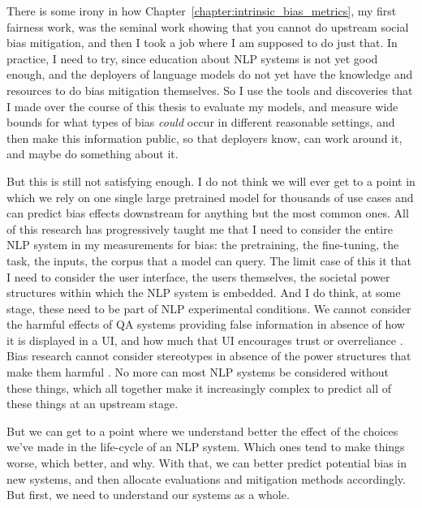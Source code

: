 There is some irony in how Chapter~\ref{chapter:intrinsic_bias_metrics}, my first fairness work, was the seminal work showing that you cannot do upstream social bias mitigation, and then I took a job where I am supposed to do just that. In practice, I need to try, since education about NLP systems is not yet good enough, and the deployers of language models do not yet have the knowledge and resources to do bias mitigation themselves. So I use the tools and discoveries that I made over the course of this thesis to evaluate my models, and measure wide bounds for what types of bias \textit{could} occur in different reasonable settings, and then make this information public, so that deployers know, can work around it, and maybe do something about it.

But this is still not satisfying enough. I do not think we will ever get to a point in which we rely on one single large pretrained model for thousands of use cases and can predict bias effects downstream for anything but the most common ones. All of this research has progressively taught me that I need to consider the entire NLP system in my measurements for bias: the pretraining, the fine-tuning, the task, the inputs, the corpus that a model can query. The limit case of this it that I need to consider the user interface, the users themselves, the societal power structures within which the NLP system is embedded. And I do think, at some stage, these need to be part of NLP experimental conditions. We cannot consider the harmful effects of QA systems providing false information in absence of how it is displayed in a UI, and how much that UI encourages trust or overreliance \citep{bucinca_2021}. Bias research cannot consider stereotypes in absence of the power structures that make them harmful \citep{blodgett-etal-2021-stereotyping}. No more can most NLP systems be considered without these things, which all together make it increasingly complex to predict all of these things at an upstream stage. 

But we can get to a point where we understand better the effect of the choices we've made in the life-cycle of an NLP system. Which ones tend to make things worse, which better, and why. With that, we can better predict potential bias in new systems, and then allocate evaluations and mitigation methods accordingly. But first, we need to understand our systems as a whole.













